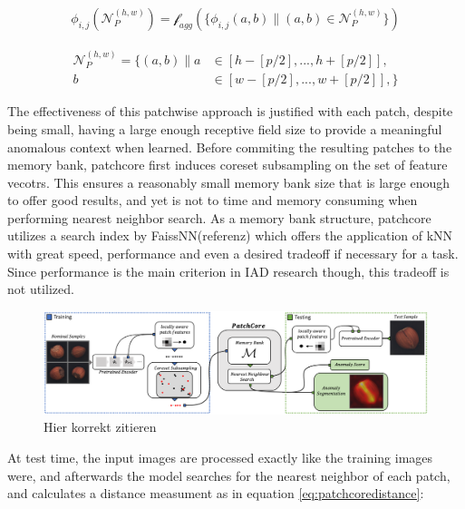 \begin{equation}
    \label{eq:patchcorepatches}
    \begin{split}
    \phi_{i,j} (\mathcal{N}_{P}^{(h,w)}) = \mathcal{f}_{agg}(\{ \phi_{i,j}(a,b) \| (a,b) \in \mathcal{N}_{P}^{(h,w)} \})
    \end{split}
\end{equation}

\begin{equation}
    \label{eq:neighborhood}
    \begin{split}
    \mathcal{N}_{P}^{(h,w)} = \{ (a,b) \| a & \in [h - [p/2], ..., h + [p/2]], \\
                                              b & \in [w - [p/2], ..., w + [p/2]], \}
    \end{split}
\end{equation}

The effectiveness of this patchwise approach is justified with each patch, despite being small, having a large enough receptive field size to provide a meaningful anomalous context when learned. 
Before commiting the resulting patches to the memory bank, patchcore first induces coreset subsampling on the set of feature vecotrs. This ensures a reasonably small memory bank size that is 
large enough to offer good results, and yet is not to time and memory consuming when performing nearest neighbor search. As a memory bank structure, patchcore utilizes a search index by FaissNN(referenz) 
which offers the application of kNN with great speed, performance and even a desired tradeoff if necessary for a task. Since performance is the main criterion in IAD research though, this tradeoff is not 
utilized. 

\begin{figure}[ht]
    \centering
    \includegraphics[width=\textwidth]{figures/pathcore_architecture.png}
    \caption{Hier korrekt zitieren}
    \label{fig:patchcorearchitecture}
\end{figure}

At test time, the input images are processed exactly like the training images were, and afterwards the model searches for the nearest neighbor of each patch, and calculates a distance measument as 
in equation \ref{eq:patchcoredistance}:

